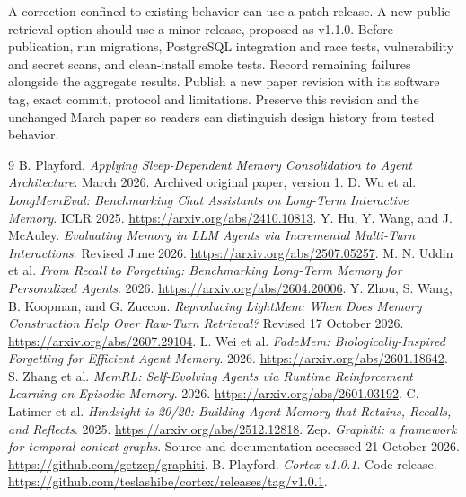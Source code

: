 \documentclass[11pt]{article}
\begin{document}
A correction confined to existing behavior can use a patch release. A new public retrieval option should use a minor release, proposed as v1.1.0. Before publication, run migrations, PostgreSQL integration and race tests, vulnerability and secret scans, and clean-install smoke tests. Record remaining failures alongside the aggregate results. Publish a new paper revision with its software tag, exact commit, protocol and limitations. Preserve this revision and the unchanged March paper so readers can distinguish design history from tested behavior.

\begin{thebibliography}{9}
 B. Playford. \emph{Applying Sleep-Dependent Memory Consolidation to Agent Architecture}. March 2026. Archived original paper, version 1.
 D. Wu et al. \emph{LongMemEval: Benchmarking Chat Assistants on Long-Term Interactive Memory}. ICLR 2025. \url{https://arxiv.org/abs/2410.10813}.
 Y. Hu, Y. Wang, and J. McAuley. \emph{Evaluating Memory in LLM Agents via Incremental Multi-Turn Interactions}. Revised June 2026. \url{https://arxiv.org/abs/2507.05257}.
 M. N. Uddin et al. \emph{From Recall to Forgetting: Benchmarking Long-Term Memory for Personalized Agents}. 2026. \url{https://arxiv.org/abs/2604.20006}.
 Y. Zhou, S. Wang, B. Koopman, and G. Zuccon. \emph{Reproducing LightMem: When Does Memory Construction Help Over Raw-Turn Retrieval?} Revised 17 October 2026. \url{https://arxiv.org/abs/2607.29104}.
 L. Wei et al. \emph{FadeMem: Biologically-Inspired Forgetting for Efficient Agent Memory}. 2026. \url{https://arxiv.org/abs/2601.18642}.
 S. Zhang et al. \emph{MemRL: Self-Evolving Agents via Runtime Reinforcement Learning on Episodic Memory}. 2026. \url{https://arxiv.org/abs/2601.03192}.
 C. Latimer et al. \emph{Hindsight is 20/20: Building Agent Memory that Retains, Recalls, and Reflects}. 2025. \url{https://arxiv.org/abs/2512.12818}.
 Zep. \emph{Graphiti: a framework for temporal context graphs}. Source and documentation accessed 21 October 2026. \url{https://github.com/getzep/graphiti}.
 B. Playford. \emph{Cortex v1.0.1}. Code release. \url{https://github.com/teslashibe/cortex/releases/tag/v1.0.1}.
\end{thebibliography}
\end{document}
